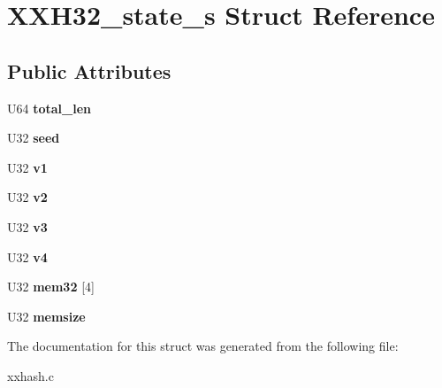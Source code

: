 \hypertarget{structXXH32__state__s}{}\section{X\+X\+H32\+\_\+state\+\_\+s Struct Reference}
\label{structXXH32__state__s}
\subsection*{Public Attributes}
\begin{DoxyCompactItemize}
\item 
\hypertarget{structXXH32__state__s_a4e62fa8e49ee081c410ef0db03e7881d}{}U64 {\bfseries total\+\_\+len}\label{structXXH32__state__s_a4e62fa8e49ee081c410ef0db03e7881d}

\item 
\hypertarget{structXXH32__state__s_a1f7f349969988e1d9f03b2d235fc9fe3}{}U32 {\bfseries seed}\label{structXXH32__state__s_a1f7f349969988e1d9f03b2d235fc9fe3}

\item 
\hypertarget{structXXH32__state__s_a7c5d4671fadb20471cf0cbc973c46a6c}{}U32 {\bfseries v1}\label{structXXH32__state__s_a7c5d4671fadb20471cf0cbc973c46a6c}

\item 
\hypertarget{structXXH32__state__s_aed7c2f4c986a443ff33b774039cf75d6}{}U32 {\bfseries v2}\label{structXXH32__state__s_aed7c2f4c986a443ff33b774039cf75d6}

\item 
\hypertarget{structXXH32__state__s_a825d49f22f9507dfef9a1dee7ffaaaa6}{}U32 {\bfseries v3}\label{structXXH32__state__s_a825d49f22f9507dfef9a1dee7ffaaaa6}

\item 
\hypertarget{structXXH32__state__s_afa4ebf67530d96c18cd9a78944ac0845}{}U32 {\bfseries v4}\label{structXXH32__state__s_afa4ebf67530d96c18cd9a78944ac0845}

\item 
\hypertarget{structXXH32__state__s_ac6355837150cc4ced85707b8cdac9160}{}U32 {\bfseries mem32} \mbox{[}4\mbox{]}\label{structXXH32__state__s_ac6355837150cc4ced85707b8cdac9160}

\item 
\hypertarget{structXXH32__state__s_a278f0b2483832e374614a37af937da54}{}U32 {\bfseries memsize}\label{structXXH32__state__s_a278f0b2483832e374614a37af937da54}

\end{DoxyCompactItemize}


The documentation for this struct was generated from the following file\+:\begin{DoxyCompactItemize}
\item 
xxhash.\+c\end{DoxyCompactItemize}
